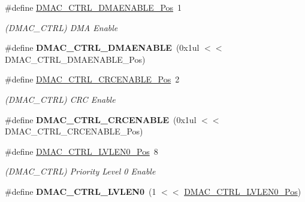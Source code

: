 \begin{DoxyCompactItemize}
\item 
\hypertarget{group___s_a_m_l21___d_m_a_c_ga16a147fe26766c00dc2d933d0681d7ef}{}\#define \hyperlink{group___s_a_m_l21___d_m_a_c_ga16a147fe26766c00dc2d933d0681d7ef}{D\+M\+A\+C\+\_\+\+C\+T\+R\+L\+\_\+\+D\+M\+A\+E\+N\+A\+B\+L\+E\+\_\+\+Pos}~1\label{group___s_a_m_l21___d_m_a_c_ga16a147fe26766c00dc2d933d0681d7ef}

\begin{DoxyCompactList}\small\item\em (D\+M\+A\+C\+\_\+\+C\+T\+R\+L) D\+M\+A Enable \end{DoxyCompactList}\item 
\hypertarget{group___s_a_m_l21___d_m_a_c_ga7d168e70bb5a265f0a4cccfb89b5bd27}{}\#define {\bfseries D\+M\+A\+C\+\_\+\+C\+T\+R\+L\+\_\+\+D\+M\+A\+E\+N\+A\+B\+L\+E}~(0x1ul $<$$<$ D\+M\+A\+C\+\_\+\+C\+T\+R\+L\+\_\+\+D\+M\+A\+E\+N\+A\+B\+L\+E\+\_\+\+Pos)\label{group___s_a_m_l21___d_m_a_c_ga7d168e70bb5a265f0a4cccfb89b5bd27}

\item 
\hypertarget{group___s_a_m_l21___d_m_a_c_gaf4676b3b856c945a02c7c2406f465190}{}\#define \hyperlink{group___s_a_m_l21___d_m_a_c_gaf4676b3b856c945a02c7c2406f465190}{D\+M\+A\+C\+\_\+\+C\+T\+R\+L\+\_\+\+C\+R\+C\+E\+N\+A\+B\+L\+E\+\_\+\+Pos}~2\label{group___s_a_m_l21___d_m_a_c_gaf4676b3b856c945a02c7c2406f465190}

\begin{DoxyCompactList}\small\item\em (D\+M\+A\+C\+\_\+\+C\+T\+R\+L) C\+R\+C Enable \end{DoxyCompactList}\item 
\hypertarget{group___s_a_m_l21___d_m_a_c_gab7a1fe4c21492dd60857ad94caae6f0c}{}\#define {\bfseries D\+M\+A\+C\+\_\+\+C\+T\+R\+L\+\_\+\+C\+R\+C\+E\+N\+A\+B\+L\+E}~(0x1ul $<$$<$ D\+M\+A\+C\+\_\+\+C\+T\+R\+L\+\_\+\+C\+R\+C\+E\+N\+A\+B\+L\+E\+\_\+\+Pos)\label{group___s_a_m_l21___d_m_a_c_gab7a1fe4c21492dd60857ad94caae6f0c}

\item 
\hypertarget{group___s_a_m_l21___d_m_a_c_gaa6ad12534fe857756f8d01c7059229cc}{}\#define \hyperlink{group___s_a_m_l21___d_m_a_c_gaa6ad12534fe857756f8d01c7059229cc}{D\+M\+A\+C\+\_\+\+C\+T\+R\+L\+\_\+\+L\+V\+L\+E\+N0\+\_\+\+Pos}~8\label{group___s_a_m_l21___d_m_a_c_gaa6ad12534fe857756f8d01c7059229cc}

\begin{DoxyCompactList}\small\item\em (D\+M\+A\+C\+\_\+\+C\+T\+R\+L) Priority Level 0 Enable \end{DoxyCompactList}\item 
\hypertarget{group___s_a_m_l21___d_m_a_c_gad95a07126b66ff6e5ff753081103161e}{}\#define {\bfseries D\+M\+A\+C\+\_\+\+C\+T\+R\+L\+\_\+\+L\+V\+L\+E\+N0}~(1 $<$$<$ \hyperlink{group___s_a_m_l21___d_m_a_c_gaa6ad12534fe857756f8d01c7059229cc}{D\+M\+A\+C\+\_\+\+C\+T\+R\+L\+\_\+\+L\+V\+L\+E\+N0\+\_\+\+Pos})\label{group___s_a_m_l21___d_m_a_c_gad95a07126b66ff6e5ff753081103161e}


\end{DoxyCompactItemize}
